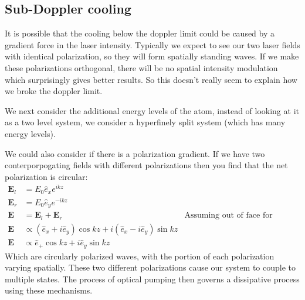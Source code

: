 \subsection{Sub-Doppler cooling}
It is possible that the cooling below the doppler limit could be caused by a gradient force in the laser intensity.
Typically we expect to see our two laser fields with identical polarization, so they will form spatially standing waves.
If we make these polarizations orthogonal, there will be no spatial intensity modulation which surprisingly gives better results.
So this doesn't really seem to explain how we broke the doppler limit.

We next consider the additional energy levels of the atom, instead of looking at it as a two level system, we consider a hyperfinely split system (which has many energy levels).

We could also consider if there is a polarization gradient. If we have two conterporpogating fields with different polarizations then you find that the net polarization is circular:
\begin{align*}
	\bm{E}_l &= E_0\hat{e}_x e^{ikz} \\
	\bm{E}_r &= E_0\hat{e}_y e^{-ikz} \\
	\bm{E} &= \bm{E}_l + \bm{E}_r & \text{Assuming out of face for simplicity} \\
	\bm{E} &\propto (\hat{e}_x + i\hat{e}_y)\cos kz + i(\hat{e}_x - i\hat{e}_y)\sin kz \\
	\bm{E} &\propto \hat{e}_+\cos kz + i\hat{e}_y\sin kz
\end{align*}
Which are circularly polarized waves, with the portion of each polarization varying spatially. These two different polarizations cause our system to couple to multiple states.
The process of optical pumping then governs a dissipative process using these mechanisms.

